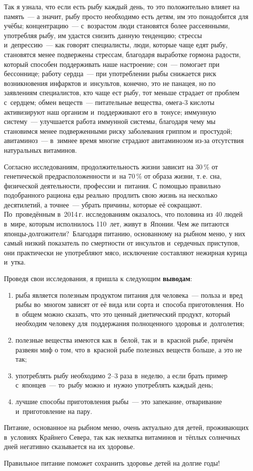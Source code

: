 Так я узнала, что если есть рыбу каждый день, то это положительно влияет на память~--- а значит, рыбу просто необходимо есть детям, им это понадобится для учёбы; концентрацию~---  с~возрастом люди становятся более рассеянными, употребляя рыбу, им удастся снизить данную тенденцию; стрессы и~депрессию~--- как говорят специалисты, люди, которые чаще едят рыбу, становятся менее подвержены стрессам, благодаря выработке гормона радости, который способен поддерживать наше настроение; сон~--- помогает при бессоннице; работу сердца~--- при употреблении рыбы снижается риск возникновения инфарктов и~инсультов, конечно, это не панацея, но по заявлениям специалистов, кто чаще ест рыбу, тот меньше страдает от проблем с~сердцем; обмен веществ~--- питательные вещества, омега-3 кислоты активизируют наш организм и~поддерживают его в~тонусе; иммунную систему~--- улучшается работа иммунной системы, благодаря чему мы становимся менее подверженными риску заболевания гриппом и~простудой; авитаминоз~--- в~зимнее время многие страдают авитаминозом из-за отсутствия натуральных витаминов.

Согласно исследованиям, продолжительность жизни зависит на 30\,\% от генетической предрасположенности и~на 70\,\% от образа жизни, т.\,е. сна, физической деятельности, профессии и~питания. С помощью правильно подобранного рациона еды реально продлить свою жизнь на несколько десятилетий, а точнее~--- убрать причины, которые её сокращают. По~проведённым в~2014\,г. исследованиям оказалось, что половина из 40 людей в~мире, которым исполнилось 110~лет, живут в~Японии. Чем же питаются японцы-долгожители? Благодаря питанию, основанному на рыбном меню, у них самый низкий показатель по смертности от инсультов и~сердечных приступов, они практически не употребляют мясо, исключение составляют нежирная курица и~утка. 

Проведя свои исследования, я пришла к следующим \textbf{выводам}:
\begin{enumerate}[noitemsep]\vspace{-6pt}
\item рыба является полезным продуктом питания для человека~--- польза и~вред рыбы во~многом зависят от её вида или сорта и~способа приготовления. Но в~общем можно сказать, что это ценный диетический продукт, который необходим человеку для~поддержания полноценного здоровья и~долголетия;
\item полезные вещества имеются как в~белой, так и~в~красной рыбе,  причём развеян миф о том, что в~красной рыбе полезных веществ больше, а это не так;
\item употреблять рыбу необходимо 2--3 раза в~неделю, а если брать пример с~японцев~--- то~рыбу можно и~нужно употреблять каждый день;
\item лучшие способы приготовления рыбы~--- это запекание, отваривание и~приготовление на пару.
\end{enumerate}\vspace{-6pt}

Питание, основанное на рыбном меню, очень актуально для детей, проживающих в~условиях Крайнего Севера, так как нехватка витаминов и~тёплых солнечных дней негативно сказывается на их здоровье.

Правильное питание поможет сохранить здоровье детей на долгие годы!
